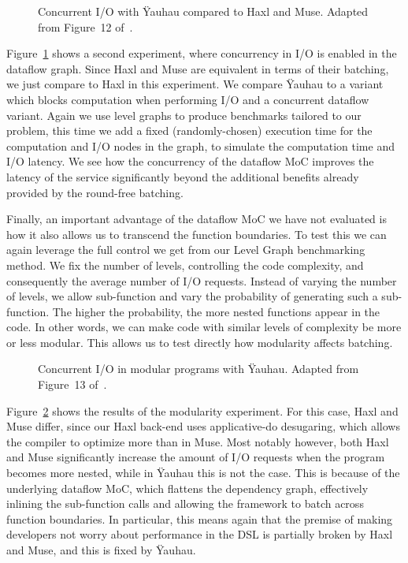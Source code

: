 \begin{figure}[t]
    	\centering
		\caption{Concurrent \ac{I/O} with \"{Y}auhau compared to Haxl and Muse. Adapted from Figure~12 of~\cite{ertel_cc18}.}	
		\label{fig:yauhau_io-imbalance}
	\end{figure}

Figure~\ref{fig:yauhau_io-imbalance} shows a second experiment, where concurrency in \ac{I/O} is enabled in the dataflow graph.
Since Haxl and Muse are equivalent in terms of their batching, we just compare to Haxl in this experiment.
We compare \"{Y}auhau to a variant which blocks computation when performing \ac{I/O} and a concurrent dataflow variant.
Again we use level graphs to produce benchmarks tailored to our problem, this time we add a fixed (randomly-chosen) execution time for the computation and \ac{I/O} nodes in the graph, to simulate the computation time and \ac{I/O} latency.
We see how the concurrency of the dataflow \ac{MoC} improves the latency of the service significantly beyond the additional benefits already provided by the round-free batching.

Finally, an important advantage of the dataflow \ac{MoC} we have not evaluated is how it also allows us to transcend the function boundaries.
To test this we can again leverage the full control we get from our Level Graph benchmarking method.
We fix the number of levels, controlling the code complexity, and consequently the average number of \ac{I/O} requests.
Instead of varying the number of levels, we allow sub-function and vary the probability of generating such a sub-function.
The higher the probability, the more nested functions appear in the code.
In other words, we can make code with similar levels of complexity be more or less modular.
This allows us to test directly how modularity affects batching.

\begin{figure}[t]
	\centering
	\caption{Concurrent \ac{I/O} in modular programs with \"{Y}auhau. Adapted from Figure~13 of~\cite{ertel_cc18}.}
	\label{fig:yauhau_efficient-modularity}
\end{figure}

Figure~\ref{fig:yauhau_efficient-modularity} shows the results of the modularity experiment.
For this case, Haxl and Muse differ, since our Haxl back-end uses applicative-do desugaring, which allows the compiler to optimize more than in Muse.
Most notably however, both Haxl and Muse significantly increase the amount of \ac{I/O} requests when the program becomes more nested, while in \"{Y}auhau this is not the case.
This is because of the underlying dataflow \ac{MoC}, which flattens the dependency graph, effectively inlining the sub-function calls and allowing the framework to batch across function boundaries.
In particular, this means again that the premise of making developers not worry about performance in the \ac{DSL} is partially broken by Haxl and Muse, and this is fixed by \"{Y}auhau.

